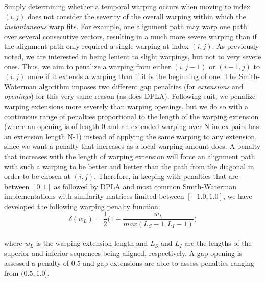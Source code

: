 \documentclass[a4paper,12pt]{report} 	%
\numberwithin{figure}{chapter}
\numberwithin{table}{chapter}
\numberwithin{equation}{chapter}
\begin{document}
\begin{flushleft}
Simply determining whether a temporal warping occurs when moving to index $(i,j)$ does not consider the severity of the overall warping within which the \emph{instantaneous} warp fits. For example, one alignment path may warp one path over several consecutive vectors, resulting in a much more severe warping than if the alignment path only required a single warping at index $(i,j)$. As previously noted, we are interested in being lenient to slight warpings, but not to very severe ones. Thus, we aim to penalize a warping from either $(i,j-1)$ or $(i-1,j)$ to $(i,j)$ more if it extends a warping than if it is the beginning of one. The Smith-Waterman algorithm imposes two different gap penalties (for \emph{extensions} and \emph{openings}) for this very same reason (as does DPLA). Following suit, we penalize warping extensions more severely than warping openings, but we do so with a continuous range of penalties proportional to the length of the warping extension (where an opening is of length 0 and an extended warping over N index pairs has an extension length N-1) instead of applying the same warping to any extension, since we want a penalty that increases as a local warping amount does. A penalty that increases with the length of warping extension will force an alignment path with such a warping to be better and better than the path from the diagonal in order to be chosen at $(i,j)$. Therefore, in keeping with penalties that are between $[0,1]$ as followed by DPLA and most common Smith-Waterman implementations with similarity matrices limited between $[-1.0,1.0]$, we have developed the following warping penalty function:
\begin{equation}
\delta(w_L) = \frac{1}{2}\bigg(1 + \frac{w_L}{max(L_S - 1,L_I - 1)}\bigg)
\end{equation}
\\
\vspace{10 mm}
\noindent where $w_L$ is the warping extension length and $L_S$ and $L_I$ are the lengths of the superior and inferior sequences being aligned, respectively. A gap opening is assessed a penalty of $0.5$ and gap extensions are able to assess penalties ranging from $(0.5,1.0]$.


\end{flushleft}
\end{document}
